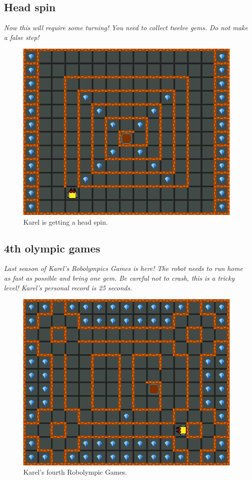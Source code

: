 \subsection{Head spin}

{\em Now this will require some turning! You need to collect twelve gems. Do not make a false step!}

\begin{figure}[!ht]
\begin{center}
\includegraphics[height=0.4\textwidth]{img/a07.png}
\end{center}
\vspace{-4mm}
\caption{Karel is getting a head spin.}
\label{fig:a07}
\vspace{-1cm}
\end{figure}
\noindent

\subsection{4th olympic games}

{\em Last season of Karel's Robolympics Games is here! The robot needs to run home as fast as possible and bring one gem. Be careful not to crash, this is a tricky level! Karel's personal record is 25 seconds.}\\[-7mm]

\begin{figure}[!ht]
\begin{center}
\includegraphics[height=0.4\textwidth]{img/a08.png}
\end{center}
\vspace{-4mm}
\caption{Karel's fourth Robolympic Games.}
\label{fig:a08}
\vspace{-4mm}
\end{figure}
\noindent

